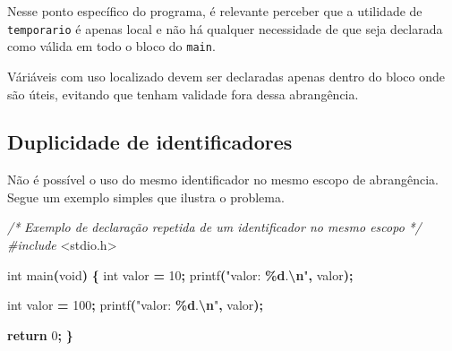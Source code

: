 \documentclass[
  11pt,
  a4paper,
]{scrbook}
\newenvironment{Shaded}{\begin{snugshade}}{\end{snugshade}}
\newcommand{\CommentTok}[1]{\textcolor[rgb]{0.56,0.35,0.01}{\textit{#1}}}
\newcommand{\ControlFlowTok}[1]{\textcolor[rgb]{0.13,0.29,0.53}{\textbf{#1}}}
\newcommand{\DataTypeTok}[1]{\textcolor[rgb]{0.13,0.29,0.53}{#1}}
\newcommand{\DecValTok}[1]{\textcolor[rgb]{0.00,0.00,0.81}{#1}}
\newcommand{\ImportTok}[1]{#1}
\newcommand{\NormalTok}[1]{#1}
\newcommand{\OperatorTok}[1]{\textcolor[rgb]{0.81,0.36,0.00}{\textbf{#1}}}
\newcommand{\PreprocessorTok}[1]{\textcolor[rgb]{0.56,0.35,0.01}{\textit{#1}}}
\newcommand{\SpecialCharTok}[1]{\textcolor[rgb]{0.81,0.36,0.00}{\textbf{#1}}}
\newcommand{\StringTok}[1]{\textcolor[rgb]{0.31,0.60,0.02}{#1}}
\begin{document}
Nesse ponto específico do programa, é relevante perceber que a utilidade
de \texttt{temporario} é apenas local e não há qualquer necessidade de
que seja declarada como válida em todo o bloco do \texttt{main}.

\begin{tcolorbox}[enhanced jigsaw, arc=.35mm, bottomtitle=1mm, colbacktitle=quarto-callout-tip-color!10!white, title=\textcolor{quarto-callout-tip-color}{\faLightbulb}\hspace{0.5em}{Dica}, toprule=.15mm, left=2mm, opacityback=0, colback=white, colframe=quarto-callout-tip-color-frame, opacitybacktitle=0.6, bottomrule=.15mm, leftrule=.75mm, toptitle=1mm, coltitle=black, titlerule=0mm, rightrule=.15mm, breakable]

Váriáveis com uso localizado devem ser declaradas apenas dentro do bloco
onde são úteis, evitando que tenham validade fora dessa abrangência.

\end{tcolorbox}

\subsection{Duplicidade de
identificadores}\label{duplicidade-de-identificadores}

Não é possível o uso do mesmo identificador no mesmo escopo de
abrangência. Segue um exemplo simples que ilustra o problema.

\begin{Shaded}
\begin{Highlighting}[]
\CommentTok{/*}
\CommentTok{Exemplo de declaração repetida de um identificador no mesmo escopo}
\CommentTok{*/}
\PreprocessorTok{\#include }\ImportTok{\textless{}stdio.h\textgreater{}}

\DataTypeTok{int}\NormalTok{ main}\OperatorTok{(}\DataTypeTok{void}\OperatorTok{)} \OperatorTok{\{}
    \DataTypeTok{int}\NormalTok{ valor }\OperatorTok{=} \DecValTok{10}\OperatorTok{;}
\NormalTok{    printf}\OperatorTok{(}\StringTok{"valor: }\SpecialCharTok{\%d}\StringTok{.}\SpecialCharTok{\textbackslash{}n}\StringTok{"}\OperatorTok{,}\NormalTok{ valor}\OperatorTok{);}
    
    \DataTypeTok{int}\NormalTok{ valor }\OperatorTok{=} \DecValTok{100}\OperatorTok{;}
\NormalTok{    printf}\OperatorTok{(}\StringTok{"valor: }\SpecialCharTok{\%d}\StringTok{.}\SpecialCharTok{\textbackslash{}n}\StringTok{"}\OperatorTok{,}\NormalTok{ valor}\OperatorTok{);}
    
    \ControlFlowTok{return} \DecValTok{0}\OperatorTok{;}
\OperatorTok{\}}
\end{Highlighting}
\end{Shaded}
\end{document}

